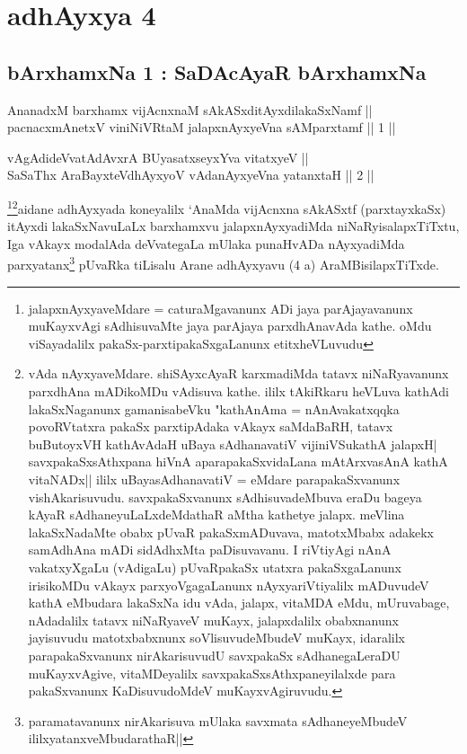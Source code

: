 \chapter{adhAyxya 4}
\section*{bArxhamxNa 1 : SaDAcAyaR bArxhamxNa}


\begin{shl}
AnanadxM barxhamx vijAcnxnaM sAkASxditAyxdilakaSxNamf || \\
pacnacxmAnetxV viniNiVRtaM jalapxnAyxyeVna sAMparxtamf \hfill || 1 ||  
\end{shl}
				
\begin{shl}
vAgAdideVvatAdAvxrA BUyasatxseyxYva vitatxyeV || \\
SaSaThx AraBayxteV\s dhAyxyoV vAdanAyxyeVna yatanxtaH \hfill ||  2 ||  
\end{shl}

\begin{artha}
\footnote{jalapxnAyxyaveMdare = caturaMgavanunx ADi jaya parAjayavanunx muKayxvAgi sAdhisuvaMte jaya parAjaya parxdhAnavAda kathe. oMdu viSayadalilx pakaSx-parxtipakaSxgaLanunx etitxheVLuvudu}\footnote{vAda nAyxyaveMdare. shiSAyxcAyaR karxmadiMda tatavx niNaRyavanunx parxdhAna mADikoMDu vAdisuva kathe. ililx tAkiRkaru heVLuva kathAdi lakaSxNaganunx gamanisabeVku "kathAnAma = nAnAvakatxqqka povoRVtatxra pakaSx parxtipAdaka vAkayx saMdaBaRH, tatavx buButoyxVH kathAvAdaH uBaya sAdhanavatiV vijiniVSukathA jalapxH| savxpakaSxsAthxpana hiVnA aparapakaSxvidaLana mAtArxvasAnA kathA vitaNADx|| ililx uBayasAdhanavatiV = eMdare parapakaSxvanunx vishAkarisuvudu. savxpakaSxvanunx sAdhisuvadeMbuva eraDu bageya kAyaR sAdhaneyuLaLxdeMdathaR aMtha kathetye jalapx. meVlina lakaSxNadaMte obabx pUvaR pakaSxmADuvava, matotxMbabx adakekx samAdhAna mADi sidAdhxMta paDisuvavanu. I riVtiyAgi nAnA vakatxyXgaLu (vAdigaLu) pUvaRpakaSx utatxra pakaSxgaLanunx irisikoMDu vAkayx parxyoVgagaLanunx nAyxyariVtiyalilx mADuvudeV kathA eMbudara lakaSxNa idu vAda, jalapx, vitaMDA eMdu, mUruvabage, nAdadalilx tatavx niNaRyaveV muKayx, jalapxdalilx obabxnanunx jayisuvudu matotxbabxnunx soVlisuvudeMbudeV muKayx, idaralilx parapakaSxvanunx nirAkarisuvudU savxpakaSx sAdhanegaLeraDU muKayxvAgive, vitaMDeyalilx savxpakaSxsAthxpaneyilalxde para pakaSxvanunx KaDisuvudoMdeV muKayxvAgiruvudu.}aidane adhAyxyada koneyalilx `AnaMda vijAcnxna sAkASxtf (parxtayxkaSx) itAyxdi lakaSxNavuLaLx barxhamxvu jalapxnAyxyadiMda niNaRyisalapxTiTxtu, Iga vAkayx modalAda deVvategaLa mUlaka punaHvADa nAyxyadiMda parxyatanx\footnote{paramatavanunx nirAkarisuva mUlaka savxmata sAdhaneyeMbudeV ililxyatanxveMbudarathaR||} pUvaRka tiLisalu Arane adhAyxyavu (4 a) AraMBisilapxTiTxde.
\end{artha}

